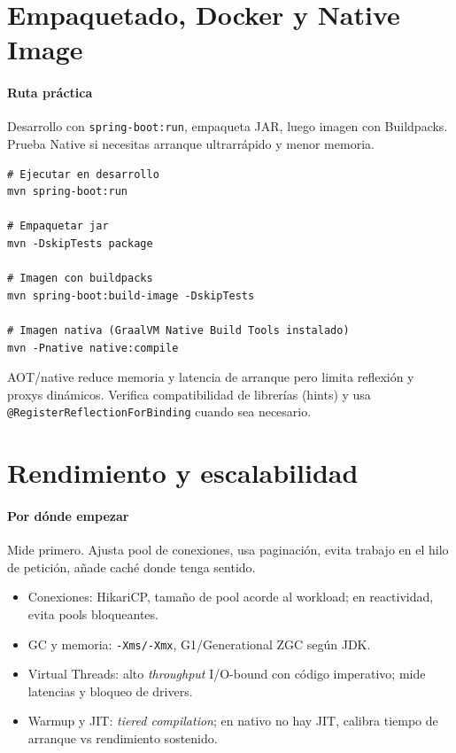 \documentclass[11pt,a4paper]{article}
\begin{document}
\section{Empaquetado, Docker y Native Image}
\paragraph{Ruta práctica}
Desarrollo con \texttt{spring-boot:run}, empaqueta JAR, luego imagen con Buildpacks. Prueba Native si necesitas arranque ultrarrápido y menor memoria.

\begin{lstlisting}[style=bashstyle, caption={Comandos útiles Maven/Gradle y contenedores}]
# Ejecutar en desarrollo
mvn spring-boot:run

# Empaquetar jar
mvn -DskipTests package

# Imagen con buildpacks
mvn spring-boot:build-image -DskipTests

# Imagen nativa (GraalVM Native Build Tools instalado)
mvn -Pnative native:compile
\end{lstlisting}

\begin{warnbox}
AOT/native reduce memoria y latencia de arranque pero limita reflexión y proxys dinámicos. Verifica compatibilidad de librerías (hints) y usa \texttt{@RegisterReflectionForBinding} cuando sea necesario.
\end{warnbox}

\section{Rendimiento y escalabilidad}
\paragraph{Por dónde empezar}
Mide primero. Ajusta pool de conexiones, usa paginación, evita trabajo en el hilo de petición, añade caché donde tenga sentido.

\begin{itemize}[leftmargin=*]
  \item Conexiones: HikariCP, tamaño de pool acorde al workload; en reactividad, evita pools bloqueantes.
  \item GC y memoria: \texttt{-Xms/-Xmx}, G1/Generational ZGC según JDK.
  \item Virtual Threads: alto \emph{throughput} I/O-bound con código imperativo; mide latencias y bloqueo de drivers.
  \item Warmup y JIT: \emph{tiered compilation}; en nativo no hay JIT, calibra tiempo de arranque vs rendimiento sostenido.
\end{itemize}
\end{document}
